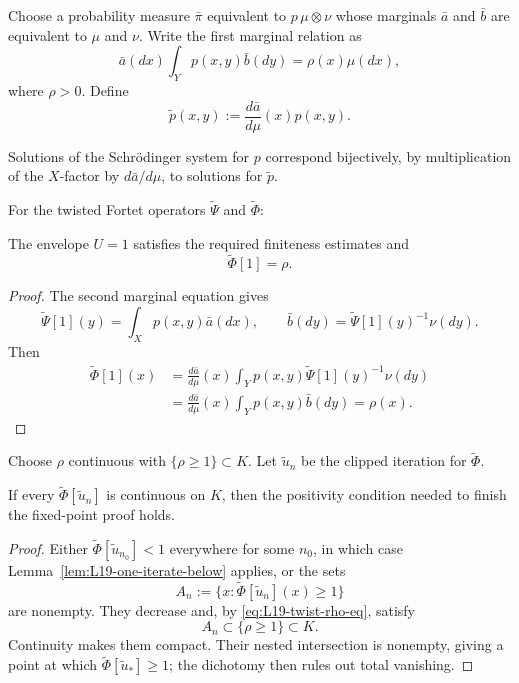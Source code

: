 Choose a probability measure $\bar\pi$ equivalent to $p\,\mu\otimes\nu$ whose marginals $\bar a$ and $\bar b$ are equivalent to $\mu$ and $\nu$.  Write the first marginal relation as
\[
 \bar a(dx)\int_Yp(x,y)\bar b(dy)=\rho(x)\mu(dx),
\]
where $\rho>0$.  Define
\begin{equation}\label{eq:L19-twisted-kernel}
 \widetilde p(x,y):=\frac{d\bar a}{d\mu}(x)p(x,y).
\end{equation}

\begin{proposition}\label{prop:L19-twist-equivalence}
Solutions of the Schr\"odinger system for $p$ correspond bijectively, by multiplication of the $X$-factor by $d\bar a/d\mu$, to solutions for $\widetilde p$.
\end{proposition}

For the twisted Fortet operators $\widetilde\Psi$ and $\widetilde\Phi$:

\begin{lemma}\label{lem:L19-twist-rho}
The envelope $U=1$ satisfies the required finiteness estimates and
\begin{equation}\label{eq:L19-twist-rho-eq}
 \widetilde\Phi[1]=\rho.
\end{equation}
\end{lemma}
\begin{proof}
The second marginal equation gives
\[
 \widetilde\Psi[1](y)=\int_Xp(x,y)\bar a(dx),
 \qquad
 \bar b(dy)=\widetilde\Psi[1](y)^{-1}\nu(dy).
\]
Then
\begin{align*}
 \widetilde\Phi[1](x)
 &=\frac{d\bar a}{d\mu}(x)
   \int_Yp(x,y)\widetilde\Psi[1](y)^{-1}\nu(dy)\\
 &=\frac{d\bar a}{d\mu}(x)
   \int_Yp(x,y)\bar b(dy)
 =\rho(x).
\end{align*}
\end{proof}

Choose $\rho$ continuous with $\{\rho\ge1\}\subset K$.  Let $\widetilde u_n$ be the clipped iteration for $\widetilde\Phi$.

\begin{lemma}\label{lem:L19-nested-compact}
If every $\widetilde\Phi[\widetilde u_n]$ is continuous on $K$, then the positivity condition needed to finish the fixed-point proof holds.
\end{lemma}
\begin{proof}
Either $\widetilde\Phi[\widetilde u_{n_0}]<1$ everywhere for some $n_0$, in which case Lemma~\ref{lem:L19-one-iterate-below} applies, or the sets
\[
 A_n:=\{x:\widetilde\Phi[\widetilde u_n](x)\ge1\}
\]
are nonempty.  They decrease and, by \eqref{eq:L19-twist-rho-eq}, satisfy
\[
 A_n\subset\{\rho\ge1\}\subset K.
\]
Continuity makes them compact.  Their nested intersection is nonempty, giving a point at which $\widetilde\Phi[\widetilde u_*]\ge1$; the dichotomy then rules out total vanishing.
\end{proof}

